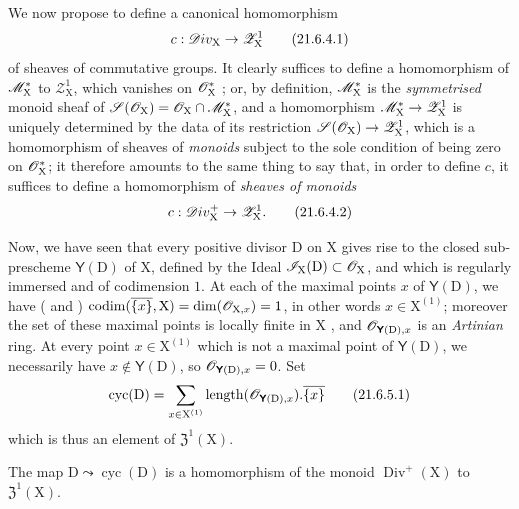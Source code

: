 \begin{env}[21.6.4]
\label{IV.21.6.4}
We now propose to define a canonical homomorphism
\[
\label{IV.21.6.4.1}
  c:\mathscr{D}iv_\mathrm{X}\to\mathscr{Z}_\mathrm{X}^1
  \tag{21.6.4.1}
\]
of sheaves of commutative groups.
It clearly suffices to define a homomorphism of $\mathscr{M}_\mathrm{X}^*$ to $\mathscr{Z}_\mathrm{X}^1$, which vanishes on $\mathscr{O}_\mathrm{X}^*$ ;
or, by definition, $\mathscr{M}_\mathrm{X}^*$ is the \emph{symmetrised} monoid sheaf of $\mathscr{S}(\mathscr{O}_\mathrm{X})=\mathscr{O}_\mathrm{X}\cap\mathscr{M}_\mathrm{X}^*$, and a homomorphism $\mathscr{M}_\mathrm{X}^*\to\mathscr{Z}_\mathrm{X}^1$ is uniquely determined by the data of its restriction $\mathscr{S}(\mathscr{O}_\mathrm{X})\to\mathscr{Z}_\mathrm{X}^1$, which is a homomorphism of sheaves of \emph{monoids} subject to the sole condition of being zero on $\mathscr{O}_\mathrm{X}^*$;
it therefore amounts to the same thing to say that, in order to define $c$, it suffices to define a homomorphism of \emph{sheaves of monoids}
\[
\label{IV.21.6.4.2}
  c:\mathscr{D}iv_\mathrm{X}^+\to\mathscr{Z}_\mathrm{X}^1.
  \tag{21.6.4.2}
\]
\end{env}

\begin{env}[21.6.5]
\label{IV.21.6.5}
Now, we have seen that every positive divisor $\mathrm{D}$ on $\mathrm{X}$ gives rise to the closed sub-prescheme $\boldsymbol{\mathsf{Y}}(\mathrm{D})$ of $\mathrm{X}$, defined by the Ideal $\mathscr{I}_\mathrm{X}(\mathrm{D})\subset\mathscr{O}_\mathrm{X}$, and which is regularly immersed and of codimension $1$.
At each of the maximal points $x$ of $\boldsymbol{\mathsf{Y}}(\mathrm{D})$, we have ( and ) $\operatorname{codim}(\overline{\{x\}},\mathrm{X})=\dim(\mathscr{O}_{\mathrm{X},x})=1$, in other words $x\in\mathrm{X}^{(1)}$;
moreover the set of these maximal points is locally finite in $\mathrm{X}$ , and $\mathscr{O}_{\boldsymbol{\mathsf{Y}}(\mathrm{D}),x}$ is an \emph{Artinian} ring.
At every point $x\in\mathrm{X}^{(1)}$ which is not a maximal point of $\boldsymbol{\mathsf{Y}}(\mathrm{D})$, we necessarily have $x\notin\boldsymbol{\mathsf{Y}}(\mathrm{D})$, so $\mathscr{O}_{\boldsymbol{\mathsf{Y}}(\mathrm{D}),x}=0$.
Set
\[
\label{IV.21.6.5.1}
  \operatorname{cyc}(\mathrm{D})=\sum_{x\in\mathrm{X}^{(1)}}\operatorname{length}(\mathscr{O}_{\boldsymbol{\mathsf{Y}}(\mathrm{D}),x}).\overline{\{x\}}
  \tag{21.6.5.1}
\]
which is thus an element of $\mathfrak{Z}^1(\mathrm{X})$.
\end{env}

\begin{proposition}[21.6.6]
\label{IV.21.6.6}
The map $\mathrm{D}\leadsto\operatorname{cyc}(\mathrm{D})$ is a homomorphism of the monoid $\operatorname{Div}^+(\mathrm{X})$ to $\mathfrak{Z}^1(\mathrm{X})$.
\end{proposition}

